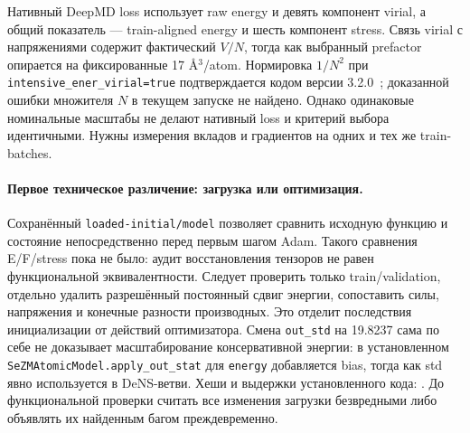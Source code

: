 \documentclass[11pt,a4paper]{article}
\begin{document}
Нативный DeepMD loss использует raw energy и девять компонент virial,
а общий показатель --- train-aligned energy и шесть компонент stress.
Связь virial с напряжениями содержит фактический $V/N$, тогда как
выбранный prefactor опирается на фиксированные 17 \AA$^3$/atom.
Нормировка $1/N^2$ при \texttt{intensive\_ener\_virial=true}
подтверждается кодом версии 3.2.0~\cite{dp-loss32}; доказанной ошибки
множителя $N$ в текущем запуске не найдено. Однако одинаковые номинальные
масштабы не делают нативный loss и критерий выбора идентичными.
Нужны измерения вкладов и градиентов на одних и тех же train-batches.

\paragraph{Первое техническое различение: загрузка или оптимизация.}
Сохранённый \texttt{loaded-initial/model} позволяет сравнить исходную
функцию и состояние непосредственно перед первым шагом Adam.
Такого сравнения E/F/stress пока не было: аудит восстановления тензоров
не равен функциональной эквивалентности. Следует проверить только
train/validation, отдельно удалить разрешённый постоянный сдвиг энергии,
сопоставить силы, напряжения и конечные разности производных.
Это отделит последствия инициализации от действий оптимизатора.
Смена \texttt{out\_std} на 19.8237 сама по себе не доказывает
масштабирование консервативной энергии: в установленном
\texttt{SeZMAtomicModel.apply\_out\_stat} для \texttt{energy}
добавляется bias, тогда как std явно используется в DeNS-ветви.
Хеши и выдержки установленного кода:
.
До функциональной проверки считать все изменения загрузки безвредными
либо объявлять их найденным багом преждевременно.
\end{document}
